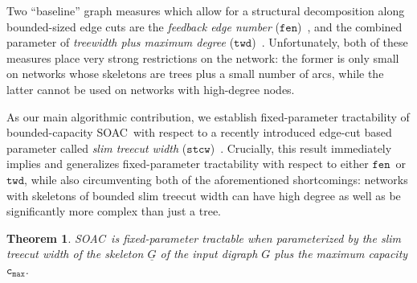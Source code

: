 \documentclass[letterpaper]{article} %
\newtheorem{theorem}{Theorem}
\newcommand{\problem}{{\sc SOAC}\xspace} %
\newcommand{\cmax}{\mathtt{c_{max}}}
\newcommand{\fen}{\ensuremath{\mathtt{fen}}}
\newcommand{\twd}{\ensuremath{\mathtt{twd}}}
\newcommand{\stcw}{\ensuremath{\mathtt{stcw}}}
\begin{document}
Two ``baseline'' graph measures which allow for a structural decomposition along bounded-sized edge cuts are the \emph{feedback edge number} (\fen)~\cite{KoanaKNNZ21,FuchsleMNR22},
and the combined parameter of \emph{treewidth plus maximum degree} (\twd)~\cite{OrdyniakS13,GozupekOPSS17}.  Unfortunately, both of these measures place very strong restrictions on the network: the former is only small on networks whose skeletons are trees plus a small number of arcs, while the latter cannot be used on networks with high-degree nodes. 

As our main algorithmic contribution, we establish fixed-parameter tractability of bounded-capacity \problem\ with respect to a recently introduced edge-cut based parameter called \emph{slim treecut width} (\stcw)~\cite{GanianK22}. Crucially, this result immediately implies and generalizes fixed-parameter tractability with respect to either \fen\ or \twd, while also circumventing both of the aforementioned shortcomings: networks with skeletons of bounded slim treecut width can have high degree as well as be significantly more complex than just a tree. 

\begin{theorem}
\label{thm:stcwfpt}
\problem\ is fixed-parameter tractable when parameterized by the slim treecut width of the skeleton $\underline G$ of the input digraph $G$ plus the maximum capacity $\cmax$.
\end{theorem}
\end{document}
